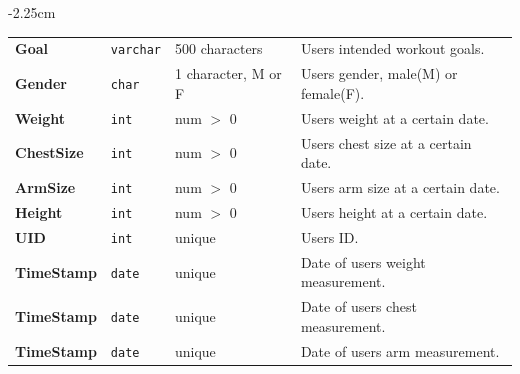 \begin{adjustwidth}{-2.25cm}{}
\begin{center}
\begin{tabular}{l|lll}
        \textbf{Goal}             & \texttt{varchar}   & 500 characters        & Users intended workout goals.  \\
        \textbf{Gender}           & \texttt{char}      & 1 character, M or F   & Users gender, male(M) or female(F).  \\
        \textbf{Weight}           & \texttt{int}       & num $>$ 0             & Users weight at a certain date.  \\
        \textbf{ChestSize}        & \texttt{int}       & num $>$ 0             & Users chest size at a certain date.  \\ \midrule
        \textbf{ArmSize}          & \texttt{int}       & num $>$ 0             & Users arm size at a certain date.  \\
        \textbf{Height}           & \texttt{int}       & num $>$ 0             & Users height at a certain date.  \\
        \textbf{UID}              & \texttt{int}       & unique                & Users ID.  \\
        \textbf{TimeStamp}        & \texttt{date}      & unique                & Date of users weight measurement.  \\ \midrule
        \textbf{TimeStamp}        & \texttt{date}      & unique                & Date of users chest measurement.  \\
        \textbf{TimeStamp}        & \texttt{date}      & unique                & Date of users arm measurement.  \\
        \bottomrule
    \end{tabular}
\end{center}
\end{adjustwidth}